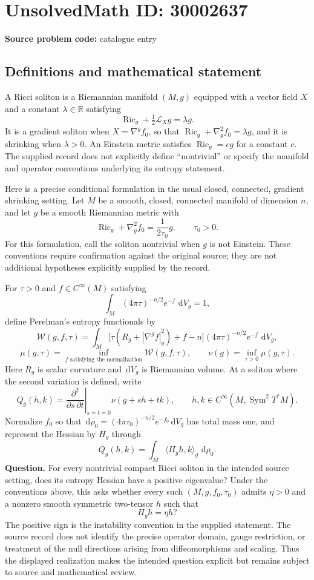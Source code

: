 \documentclass[11pt]{article}
\newcommand{\R}{\mathbb{R}}
\newcommand{\dd}{\,\mathrm{d}}
\begin{document}
\section*{UnsolvedMath ID: 30002637}
\textbf{Source problem code:} catalogue entry
\subsection{Definitions and mathematical statement}
A Ricci soliton is a Riemannian manifold \((M,g)\) equipped with a vector field \(X\) and a constant \(\lambda\in\R\) satisfying
\[
\operatorname{Ric}_g+\tfrac12\mathcal L_Xg=\lambda g.
\]
It is a gradient soliton when \(X=\nabla^g f_0\), so that \(\operatorname{Ric}_g+\nabla_g^2f_0=\lambda g\), and it is shrinking when \(\lambda>0\). An Einstein metric satisfies \(\operatorname{Ric}_g=cg\) for a constant \(c\). The supplied record does not explicitly define ``nontrivial'' or specify the manifold and operator conventions underlying its entropy statement.

Here is a precise conditional formulation in the usual closed, connected, gradient shrinking setting. Let \(M\) be a smooth, closed, connected manifold of dimension \(n\), and let \(g\) be a smooth Riemannian metric with
\[
\operatorname{Ric}_g+\nabla_g^2f_0=\frac{1}{2\tau_0}g,
\qquad \tau_0>0.
\]
For this formulation, call the soliton nontrivial when \(g\) is not Einstein. These conventions require confirmation against the original source; they are not additional hypotheses explicitly supplied by the record.

For \(\tau>0\) and \(f\in C^\infty(M)\) satisfying
\[
\int_M(4\pi\tau)^{-n/2}e^{-f}\,\dd V_g=1,
\]
define Perelman's entropy functionals by
\[
\mathcal W(g,f,\tau)=\int_M\bigl[\tau(R_g+|\nabla^g f|_g^2)+f-n\bigr](4\pi\tau)^{-n/2}e^{-f}\,\dd V_g,
\]
\[
\mu(g,\tau)=\inf_{f\text{ satisfying the normalization}}\mathcal W(g,f,\tau),
\qquad
\nu(g)=\inf_{\tau>0}\mu(g,\tau).
\]
Here \(R_g\) is scalar curvature and \(\dd V_g\) is Riemannian volume. At a soliton where the second variation is defined, write
\[
Q_g(h,k)=\left.\frac{\partial^2}{\partial s\,\partial t}\right|_{s=t=0}\nu(g+sh+tk),
\qquad h,k\in C^\infty(M,\operatorname{Sym}^2T^*M).
\]
Normalize \(f_0\) so that \(\dd\rho_0=(4\pi\tau_0)^{-n/2}e^{-f_0}\dd V_g\) has total mass one, and represent the Hessian by \(H_g\) through
\[
Q_g(h,k)=\int_M\langle H_gh,k\rangle_g\,\dd\rho_0.
\]
\textbf{Question.} For every nontrivial compact Ricci soliton in the intended source setting, does its entropy Hessian have a positive eigenvalue? Under the conventions above, this asks whether every such \((M,g,f_0,\tau_0)\) admits \(\eta>0\) and a nonzero smooth symmetric two-tensor \(h\) such that
\[
H_gh=\eta h?
\]
The positive sign is the instability convention in the supplied statement. The source record does not identify the precise operator domain, gauge restriction, or treatment of the null directions arising from diffeomorphisms and scaling. Thus the displayed realization makes the intended question explicit but remains subject to source and mathematical review.
\end{document}
